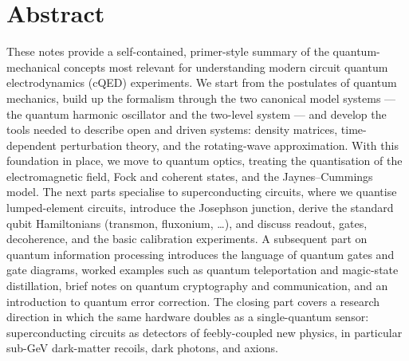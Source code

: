 \chapter*{Abstract}

These notes provide a self-contained, primer-style summary of the
quantum-mechanical concepts most relevant for understanding modern
circuit quantum electrodynamics (cQED) experiments. We start from
the postulates of quantum mechanics, build up the formalism through
the two canonical model systems --- the quantum harmonic oscillator
and the two-level system --- and develop the tools needed to
describe open and driven systems: density matrices, time-dependent
perturbation theory, and the rotating-wave approximation. With this
foundation in place, we move to quantum optics, treating the
quantisation of the electromagnetic field, Fock and coherent
states, and the Jaynes--Cummings model. The next parts specialise
to superconducting circuits, where we quantise lumped-element
circuits, introduce the Josephson junction, derive the standard
qubit Hamiltonians (transmon, fluxonium, \ldots), and discuss
readout, gates, decoherence, and the basic calibration
experiments. A subsequent part on quantum information processing
introduces the language of quantum gates and gate diagrams,
worked examples such as quantum teleportation and magic-state
distillation, brief notes on quantum cryptography and
communication, and an introduction to quantum error correction.
The closing part covers a research direction in which the same
hardware doubles as a single-quantum sensor: superconducting
circuits as detectors of feebly-coupled new physics, in particular
sub-GeV dark-matter recoils, dark photons, and axions.
